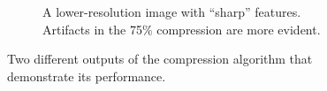 \documentclass[12pt,technote]{IEEEtran}
\begin{document}
\begin{figure}[h]
\begin{subfigure}[b]{0.3\textwidth}
        \caption{A lower-resolution image with ``sharp'' features. Artifacts in the 75\% compression are more evident.}
        \label{fig:letter_b}
    \end{subfigure}
    \label{fig:compression_outputs}
    \caption{Two different outputs of the compression algorithm that demonstrate its performance.}
\end{figure}


\end{document}
